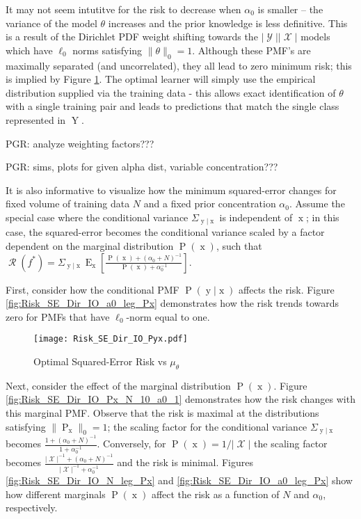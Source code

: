 \documentclass[12pt]{report}
\DeclareMathOperator{\xrm}{\mathrm{x}}
\DeclareMathOperator{\yrm}{\mathrm{y}}
\DeclareMathOperator{\Yrm}{\mathrm{Y}}
\DeclareMathOperator{\Prm}{\mathrm{P}}
\DeclareMathOperator{\Erm}{\mathrm{E}}
\DeclareMathOperator{\Xcal}{\mathcal{X}}
\DeclareMathOperator{\Ycal}{\mathcal{Y}}
\DeclareMathOperator{\Rcal}{\mathcal{R}}
\begin{document}
It may not seem intutitve for the risk to decrease when $\alpha_0$ is smaller -- the variance of the model $\theta$ increases and the prior knowledge is less definitive. This is a result of the Dirichlet PDF weight shifting towards the $|\Ycal||\Xcal|$ models which have $\ell_0$ norms satisfying $\| \theta \|_0 = 1$. Although these PMF's are maximally separated (and uncorrelated), they all lead to zero minimum risk; this is implied by Figure \ref{fig:Risk_SE_Dir_IO_Pyx}. The optimal learner will simply use the empirical distribution supplied via the training data - this allows exact identification of $\theta$ with a single training pair and leads to predictions that match the single class represented in $\Yrm$.

PGR: analyze weighting factors???

PGR: sims, plots for given alpha dist, variable concentration???

It is also informative to visualize how the minimum squared-error changes for fixed volume of training data $N$ and a fixed prior concentration $\alpha_0$. Assume the special case where the conditional variance $\Sigma_{\yrm | \xrm}$ is independent of $\xrm$; in this case, the squared-error becomes the conditional variance scaled by a factor dependent on the marginal distribution $\Prm(\xrm)$, such that $\Rcal(f^*) = \Sigma_{\yrm | \xrm} \Erm_{\xrm} \left[ \frac{\Prm(\xrm) + (\alpha_0+N)^{-1}}{\Prm(\xrm) + \alpha_0^{-1}} \right]$.

First, consider how the conditional PMF $\Prm(\yrm | \xrm)$ affects the risk. Figure \ref{fig:Risk_SE_Dir_IO_a0_leg_Px} demonstrates how the risk trends towards zero for PMFs that have $\ell_0$-norm equal to one.

\begin{figure}
\centering
\texttt{[image: Risk\_SE\_Dir\_IO\_Pyx.pdf]}
\caption{Optimal Squared-Error Risk vs $\mu_{\theta}$}
\label{fig:Risk_SE_Dir_IO_Pyx}
\end{figure}

Next, consider the effect of the marginal distribution $\Prm(\xrm)$. Figure \ref{fig:Risk_SE_Dir_IO_Px_N_10_a0_1} demonstrates how the risk changes with this marginal PMF. Observe that the risk is maximal at the distributions satisfying $\| \Prm_{\xrm} \|_0 = 1$; the scaling factor for the conditional variance $\Sigma_{\yrm | \xrm}$ becomes $\frac{1 + (\alpha_0+N)^{-1}}{1 + \alpha_0^{-1}}$. Conversely, for $\Prm(\xrm) = 1/|\Xcal|$ the scaling factor becomes $\frac{|\Xcal|^{-1} + (\alpha_0+N)^{-1}}{|\Xcal|^{-1} + \alpha_0^{-1}}$ and the risk is minimal. Figures \ref{fig:Risk_SE_Dir_IO_N_leg_Px} and \ref{fig:Risk_SE_Dir_IO_a0_leg_Px} show how different marginals $\Prm(\xrm)$ affect the risk as a function of $N$ and $\alpha_0$, respectively.
\end{document}
